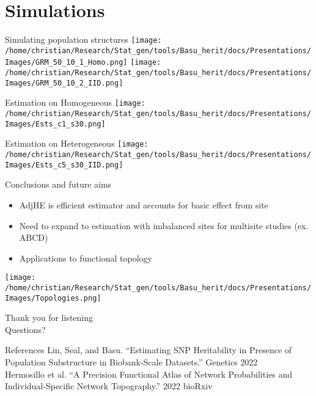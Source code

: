 \documentclass[
  ignorenonframetext,
]{beamer}
\begin{document}
\section{Simulations}
\begin{frame}{Simulating population structures}
\texttt{[image: /home/christian/Research/Stat\_gen/tools/Basu\_herit/docs/Presentations/Images/GRM\_50\_10\_1\_Homo.png]}
\texttt{[image: /home/christian/Research/Stat\_gen/tools/Basu\_herit/docs/Presentations/Images/GRM\_50\_10\_2\_IID.png]}
\end{frame}


\begin{frame}{Estimation on Homogeneous}
\centering
\texttt{[image: /home/christian/Research/Stat\_gen/tools/Basu\_herit/docs/Presentations/Images/Ests\_c1\_s30.png]}
\end{frame}

\begin{frame}{Estimation on Heterogeneous}
\centering
\texttt{[image: /home/christian/Research/Stat\_gen/tools/Basu\_herit/docs/Presentations/Images/Ests\_c5\_s30\_IID.png]}
\end{frame}



\begin{frame}{Conclusions and future aims}
\begin{itemize}
	\item AdjHE is efficient estimator and accounts for basic effect from site
	\item Need to expand to estimation with imbalanced sites for multisite studies (ex. ABCD)
	\item Applications to functional topology
\end{itemize}
\centering
\texttt{[image: /home/christian/Research/Stat\_gen/tools/Basu\_herit/docs/Presentations/Images/Topologies.png]}

\end{frame}


\begin{frame}
\begin{Huge}
Thank you for listening \\
Questions?
\end{Huge}
\end{frame}

\begin{frame}{References}
Lin, Seal, and Basu. “Estimating SNP Heritability in Presence of Population Substructure in Biobank-Scale Datasets.” Genetics 2022 \\
Hermosillo et al. “A Precision Functional Atlas of Network Probabilities and Individual-Specific Network Topography.” 2022 bioRxiv
\end{frame}
\end{document}
